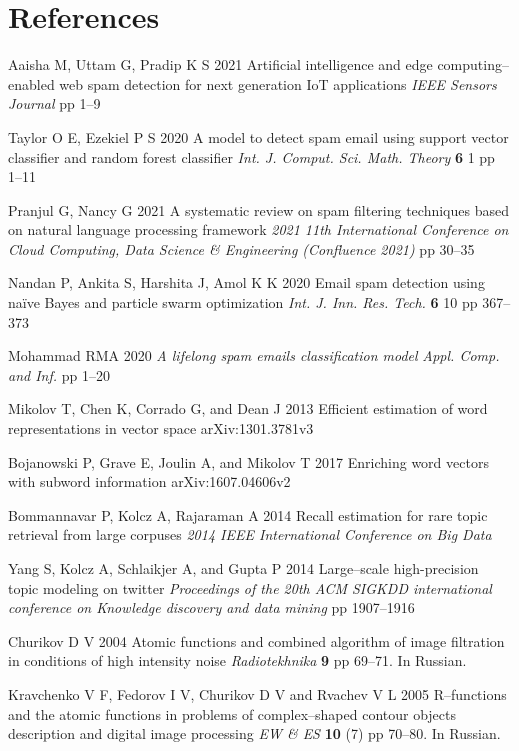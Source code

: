 \documentclass[12pt]{jpconf}
\begin{document}
\section*{References}
\begin{thebibliography}{99}
Aaisha M, Uttam G, Pradip K S
2021 {Artificial intelligence and edge computing--enabled
web spam detection for next generation IoT
applications} {\it IEEE Sensors Journal} {\bf } pp 1--9

Taylor O E, Ezekiel P S
2020 {A model to detect spam email using support vector classifier and random forest classifier} 
\emph{Int. J. Comput. Sci. Math. Theory} {\bf 6} 1 pp 1--11

Pranjul G, Nancy G
2021 {A systematic review on spam filtering techniques based on
natural language processing framework} \emph{2021 11th International Conference on Cloud Computing, Data Science \& Engineering (Confluence 2021)} pp 30--35

Nandan P, Ankita S, Harshita J, Amol K K
2020 {Email spam detection using naïve Bayes and particle swarm optimization} \emph{Int. J. Inn. Res. Tech.} {\bf 6} 10 pp 367--373

Mohammad RMA
2020 \emph{A lifelong spam emails classification model}
\emph{Appl. Comp. and Inf.} pp 1--20

Mikolov T, Chen K, Corrado G, and Dean J
2013 {Efficient estimation of word representations in vector space} 
arXiv:1301.3781v3

Bojanowski P, Grave E, Joulin A, and Mikolov T
2017 {Enriching word vectors with subword information} 
arXiv:1607.04606v2

Bommannavar P, Kolcz A, Rajaraman A
2014 {Recall estimation for rare topic retrieval from large corpuses}
\emph{2014 IEEE International Conference on Big Data}

Yang S, Kolcz A, Schlaikjer A, and Gupta P
2014 {Large--scale high-precision topic modeling on twitter} 
\emph{Proceedings of the 20th ACM SIGKDD international conference on Knowledge discovery and data mining} pp 1907--1916

 Churikov D V 2004
{Atomic functions and combined algorithm of image filtration in conditions of high intensity noise}
\emph{Radiotekhnika} \textbf{9} pp 69--71. In Russian.

Kravchenko V F, Fedorov I V, Churikov D V and Rvachev V L 2005 
{R--functions and the atomic functions in problems of complex--shaped contour objects description and digital image processing}
\emph{EW \& ES} \textbf{10} (7) pp 70--80. In Russian.
\end{thebibliography}
\end{document}
